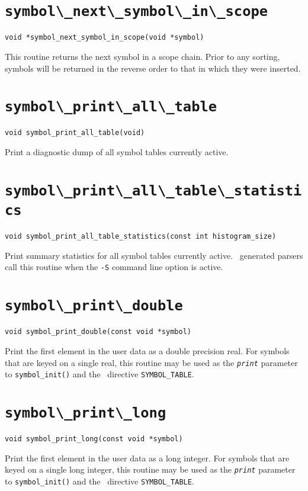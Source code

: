 \section{\protect\verb+symbol\_next\_symbol\_in\_scope+}
\begin{verbatim}
void *symbol_next_symbol_in_scope(void *symbol)
\end{verbatim}
This routine returns the next symbol in a scope chain. Prior to any
sorting, symbols will be returned in the reverse order to that in which
they were inserted.

\section{\protect\verb+symbol\_print\_all\_table+}
\begin{verbatim}
void symbol_print_all_table(void) 
\end{verbatim}
Print a diagnostic dump of all symbol tables currently active.

\section{\protect\verb+symbol\_print\_all\_table\_statistics+}
\begin{verbatim}
void symbol_print_all_table_statistics(const int histogram_size)
\end{verbatim}
Print summary statistics for all symbol tables currently active. \rdp\
generated parsers call this routine when the {\tt -S} command line
option is active.

\section{\protect\verb+symbol\_print\_double+}
\begin{verbatim}
void symbol_print_double(const void *symbol) 
\end{verbatim}
Print the first element in the user data as a double precision real.
For symbols that are keyed on a
single real, this routine may be used as the {\tt\em print}
parameter to \verb+symbol_init()+ and the \rdp\ directive \verb+SYMBOL_TABLE+.

\section{\protect\verb+symbol\_print\_long+}
\begin{verbatim}
void symbol_print_long(const void *symbol)
\end{verbatim}
Print the first element in the user data as a long integer.
For symbols that are keyed on a
single long integer, this routine may be used as the {\tt\em print}
parameter to \verb+symbol_init()+ and the \rdp\ directive \verb+SYMBOL_TABLE+.

